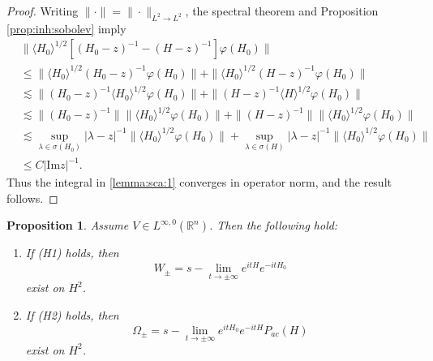 \documentclass[11pt,a4paper]{article}
\numberwithin{equation}{section}
\newtheorem{proposition}[theorem]{Proposition}
\begin{document}
\begin{proof}
Writing $\|\cdot\| = \|\cdot\|_{L^{2} \rightarrow L^{2}}$, the spectral theorem and Proposition \ref{prop:inh:sobolev} imply
\begin{equation}
\begin{aligned}
&\|\langle H_{0} \rangle^{1/2} [ (H_{0} - z)^{-1} - (H - z)^{-1} ]\varphi(H_{0})\|\\
&\leq \|\langle H_{0} \rangle^{1/2}(H_{0} - z)^{-1}\varphi(H_{0})\|
+ \|\langle H_{0} \rangle^{1/2}(H - z)^{-1}\varphi(H_{0})\| \\
&\lesssim \|(H_{0} - z)^{-1}\langle H_{0} \rangle^{1/2}\varphi(H_{0})\|
+ \|(H - z)^{-1}\langle H \rangle^{1/2}\varphi(H_{0})\| \\
&\lesssim \|(H_{0} - z)^{-1}\|\|\langle H_{0} \rangle^{1/2}\varphi(H_{0})\|
+ \|(H - z)^{-1}\|\|\langle H_{0} \rangle^{1/2}\varphi(H_{0})\| \\
&\lesssim \sup_{\lambda \in \sigma(H_{0})}|\lambda - z|^{-1}\|\langle H_{0} \rangle^{1/2}\varphi(H_{0})\|
+ \sup_{\lambda \in \sigma(H)}|\lambda - z|^{-1}\|\langle H_{0} \rangle^{1/2}\varphi(H_{0})\| \\
&\leq C|\text{Im}z|^{-1}.
\end{aligned}
\end{equation}
Thus the integral in \eqref{lemma:sca:1} converges in operator norm, and the result follows.
\end{proof}

\begin{proposition}\label{scattering-1}
Assume $V \in L^{\infty, 0}(\mathbb{R}^{n})$. Then the following hold:
\begin{enumerate}
\item If (H1) holds, then
\[
W_{\pm} = s-\lim_{t \rightarrow \pm \infty} e^{itH}e^{-itH_{0}}
\]
exist on $H^{2}$.
\item If (H2) holds, then
\[
\Omega_{\pm} = s-\lim_{t \rightarrow \pm \infty} e^{itH_{0}}e^{-itH}P_{ac}(H)
\]
exist on $H^{2}$.
\end{enumerate}
\end{proposition}
\end{document}
